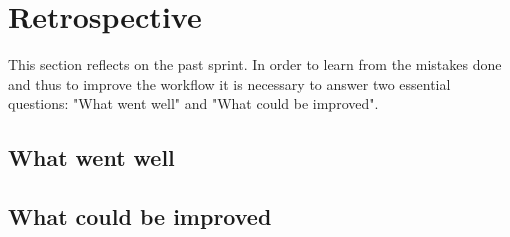 \section{Retrospective}
This section reflects on the past sprint. In order to learn from the mistakes done and thus to improve the workflow it is necessary to answer two essential questions: "What went well" and "What could be improved".

\subsection{What went well}
\subsection{What could be improved}
